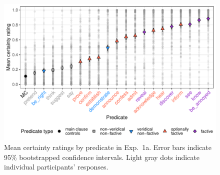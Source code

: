 \documentclass[11pt,fleqn]{article}
\newcommand{\6}{\mbox{$[\hspace*{-.6mm}[$}}
\newcommand{\9}{\mbox{$]\hspace*{-.6mm}]$}}
\begin{document}
\begin{figure}[H]
\centering

\includegraphics[width=.7\paperwidth]{../../results/5-projectivity-no-fact/graphs/means-projectivity-by-predicate-variability}

\caption{Mean certainty ratings by predicate in Exp.~1a. Error bars indicate 95\% bootstrapped confidence intervals. Light gray dots indicate individual participants' responses.} 
\label{f-projectivity}
\end{figure}




\end{document}
